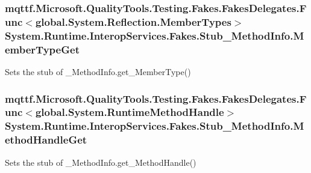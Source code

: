 \hypertarget{class_system_1_1_runtime_1_1_interop_services_1_1_fakes_1_1_stub___method_info_aefdf7166e7a031f24c7345243eaabd40}{
\subsubsection[{Member\-Type\-Get}]{\setlength{\rightskip}{0pt plus 5cm}mqttf.\-Microsoft.\-Quality\-Tools.\-Testing.\-Fakes.\-Fakes\-Delegates.\-Func$<$global.\-System.\-Reflection.\-Member\-Types$>$ System.\-Runtime.\-Interop\-Services.\-Fakes.\-Stub\-\_\-\-Method\-Info.\-Member\-Type\-Get}}\label{class_system_1_1_runtime_1_1_interop_services_1_1_fakes_1_1_stub___method_info_aefdf7166e7a031f24c7345243eaabd40}


Sets the stub of \-\_\-\-Method\-Info.\-get\-\_\-\-Member\-Type()

\hypertarget{class_system_1_1_runtime_1_1_interop_services_1_1_fakes_1_1_stub___method_info_abe8af020a530c3d250af6790fac9b876}{
\subsubsection[{Method\-Handle\-Get}]{\setlength{\rightskip}{0pt plus 5cm}mqttf.\-Microsoft.\-Quality\-Tools.\-Testing.\-Fakes.\-Fakes\-Delegates.\-Func$<$global.\-System.\-Runtime\-Method\-Handle$>$ System.\-Runtime.\-Interop\-Services.\-Fakes.\-Stub\-\_\-\-Method\-Info.\-Method\-Handle\-Get}}\label{class_system_1_1_runtime_1_1_interop_services_1_1_fakes_1_1_stub___method_info_abe8af020a530c3d250af6790fac9b876}


Sets the stub of \-\_\-\-Method\-Info.\-get\-\_\-\-Method\-Handle()

